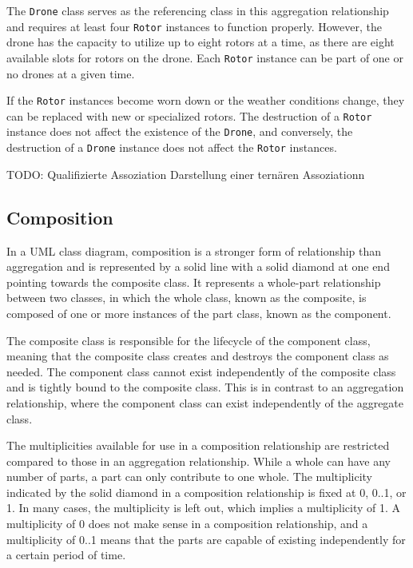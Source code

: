 \documentclass[
	12pt,
    a4paper,
    egregdoesnotlikesansseriftitles, %
    toc=chapterentrywithdots,
    oneside, openany,
    titlepage,
    parskip=half,
    headings=normal,  %
    listof=totoc,
    bibliography=totoc,
    index=totoc,
    captions=tableheading,  %
    listof=flat,
    numbers=noenddot, %
    final]
    {scrbook}
\begin{document}
The \texttt{Drone} class serves as the referencing class in this aggregation relationship and requires at least four \texttt{Rotor} instances to function properly. 
However, the drone has the capacity to utilize up to eight rotors at a time, as there are eight available slots for rotors on the drone. 
Each \texttt{Rotor} instance can be part of one or no drones at a given time.

If the \texttt{Rotor} instances become worn down or the weather conditions change, they can be replaced with new or specialized rotors. 
The destruction of a \texttt{Rotor} instance does not affect the existence of the \texttt{Drone}, and conversely, the destruction of a \texttt{Drone} instance does not affect the \texttt{Rotor} instances.

TODO: Qualifizierte Assoziation
   Darstellung einer ternären Assoziationn


\subsection{Composition}

In a UML class diagram, composition is a stronger form of relationship than aggregation and is represented by a solid line with a solid diamond at one end pointing towards the composite class. It represents a whole-part relationship between two classes, in which the whole class, known as the composite, is composed of one or more instances of the part class, known as the component.

The composite class is responsible for the lifecycle of the component class, meaning that the composite class creates and destroys the component class as needed. The component class cannot exist independently of the composite class and is tightly bound to the composite class. This is in contrast to an aggregation relationship, where the component class can exist independently of the aggregate class.

The multiplicities available for use in a composition relationship are restricted compared to those in an aggregation relationship. While a whole can have any number of parts, a part can only contribute to one whole. The multiplicity indicated by the solid diamond in a composition relationship is fixed at 0, 0..1, or 1. In many cases, the multiplicity is left out, which implies a multiplicity of 1. A multiplicity of 0 does not make sense in a composition relationship, and a multiplicity of 0..1 means that the parts are capable of existing independently for a certain period of time.
 \cite[p. 153-154]{uml}
\end{document}

